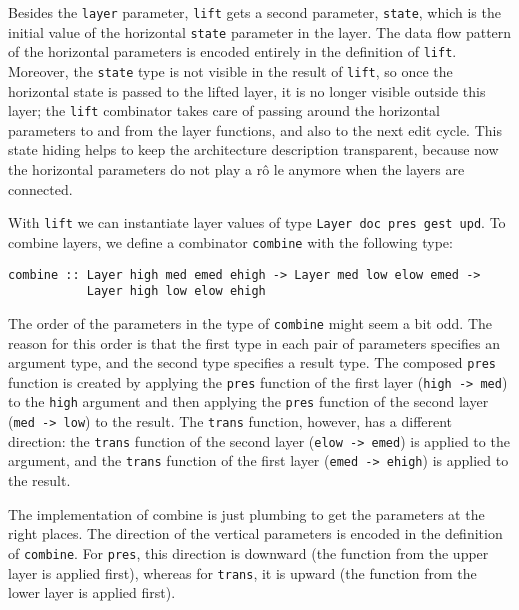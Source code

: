 Besides the \texttt{layer} parameter, \texttt{lift} gets a second parameter, \texttt{state}, which is the initial value of the horizontal \texttt{state} parameter in the layer. The data flow pattern of the horizontal parameters is encoded entirely in the definition of \texttt{lift}. Moreover, the \texttt{state} type is not visible in the result of \texttt{lift}, so once the horizontal state is passed to the lifted layer, it is no longer visible outside this layer; the \texttt{lift} combinator takes care of passing around the horizontal parameters to and from the layer functions, and also to the next edit cycle. This state hiding helps to keep the architecture description transparent, because now the horizontal parameters do not play a r\^o le anymore when the layers are connected.


With \texttt{lift} we can instantiate layer values of type \texttt{Layer doc pres gest upd}. To combine layers, we define a combinator \texttt{combine} with the following type:

\begin{small}
\begin{verbatim}
combine :: Layer high med emed ehigh -> Layer med low elow emed -> 
           Layer high low elow ehigh
\end{verbatim}
\end{small}

The order of the parameters in the type of \texttt{combine} might seem a bit odd. The reason for this order is that the first type in each pair of parameters specifies an argument type, and the second type specifies a result type. The composed \texttt{pres} function is created by applying the \texttt{pres} function of the first layer (\texttt{high -> med}) to the \texttt{high} argument and then applying the \texttt{pres} function of the second layer (\texttt{med -> low}) to the result. The \texttt{trans} function, however, has a different direction: the \texttt{trans} function of the second layer (\texttt{elow -> emed}) is applied to the argument, and the \texttt{trans} function of the first layer (\texttt{emed -> ehigh}) is applied to the result.

The implementation of combine is just plumbing to get the parameters at the right places. The direction of the vertical parameters is encoded in the definition of \texttt{combine}. For \texttt{pres}, this direction is downward (the function from the upper layer is applied first), whereas for \texttt{trans}, it is upward (the function from the lower layer is applied first).


